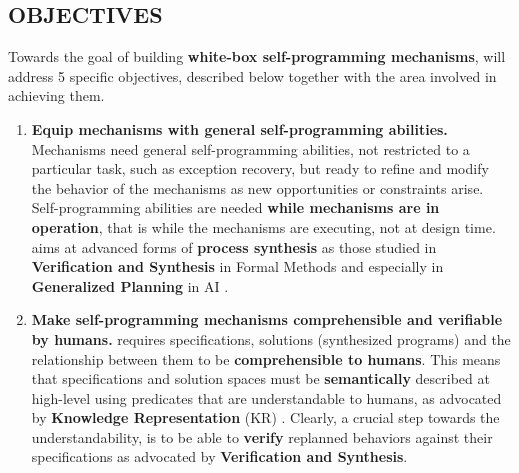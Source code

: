 \vspace{-3ex}

\subsection*{OBJECTIVES}

\vspace{-3ex}

Towards the goal of building \textbf{white-box self-programming mechanisms}, \project will address 5 specific objectives, described below together with the area involved in achieving them. 

\begin{enumerate}
\item \textbf{Equip mechanisms with general self-programming abilities.}
Mechanisms need general self-programming abilities, not
  restricted to a particular task, such as exception recovery, but ready
  to refine and modify the behavior of the mechanisms as new
  opportunities or constraints arise. 
Self-programming abilities are needed \textbf{while mechanisms
    are in operation}, that is while the mechanisms are executing, not
   at design time.
\project aims at                           
  advanced forms of \textbf{process synthesis} as those studied in
  \textbf{Verification and Synthesis} in Formal Methods \cite{PnRo89,EhlersLTV17} and especially in \textbf{Generalized Planning} in AI \cite{TorresB15,DeVa15,DeVa16,CamachoTMBM17}.
\begin{comment}
, which is proposing techniques to  
%
  \textbf{sidestep} the notorious difficulties in synthesis
     by focusing on \textbf{non-traditional forms of
  specification formalisms}, such as LTL and LDL on finite
    traces \cite{TorresB15,DeVa15,DeVa16,CamachoTMBM17}. Moroever we intend to
 exploite \textbf{algorithmic insights} form the \textbf{AI Planning}
  \cite{GeffnerBo13,GNT2016,NauGT15}.
\end{comment}


\item \textbf{Make self-programming mechanisms comprehensible and
    verifiable by humans.}  \project requires specifications,
  solutions (synthesized programs) and the relationship between them
  to be \textbf{comprehensible to humans}.  This means that
  specifications and solution spaces must be \textbf{semantically}
  described at high-level using predicates that are understandable to
  humans, as advocated by \textbf{Knowledge Representation}  (KR)
  \cite{Baral10,EiterEFS10,EiterGS10,BrewkaEP14,Shoham16,Levesque14,Levesque17}.
Clearly,  a crucial step towards the understandability, is to be able to 
\textbf{verify} replanned behaviors against their specifications as advocated by \textbf{Verification and Synthesis}.


\end{enumerate}

